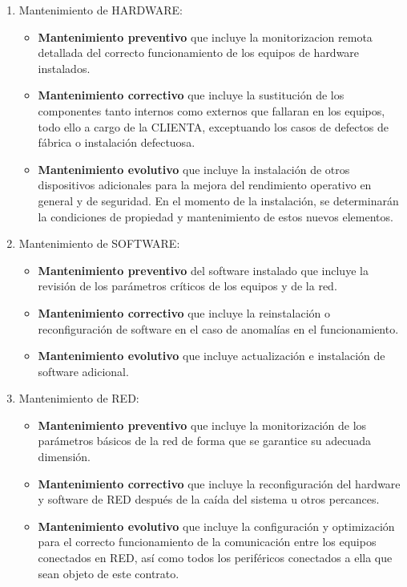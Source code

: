 \documentclass[11pt,spanish,a4paper,]{article}
\begin{document}
\begin{enumerate}
\def\labelenumi{\alph{enumi})}
\itemsep1pt\parskip0pt
\item
  Mantenimiento de HARDWARE:

  \begin{itemize}
  \itemsep1pt\parskip0pt
  \item
    \textbf{Mantenimiento preventivo} que incluye la monitorizacion
    remota detallada del correcto funcionamiento de los equipos de
    hardware instalados.
  \item
    \textbf{Mantenimiento correctivo} que incluye la sustitución de los
    componentes tanto internos como externos que fallaran en los
    equipos, todo ello a cargo de la CLIENTA, exceptuando los casos de
    defectos de fábrica o instalación defectuosa.
  \item
    \textbf{Mantenimiento evolutivo} que incluye la instalación de otros
    dispositivos adicionales para la mejora del rendimiento operativo en
    general y de seguridad. En el momento de la instalación, se
    determinarán la condiciones de propiedad y mantenimiento de estos
    nuevos elementos.
  \end{itemize}
\item
  Mantenimiento de SOFTWARE:

  \begin{itemize}
  \itemsep1pt\parskip0pt
  \item
    \textbf{Mantenimiento preventivo} del software instalado que incluye
    la revisión de los parámetros críticos de los equipos y de la red.
  \item
    \textbf{Mantenimiento correctivo} que incluye la reinstalación o
    reconfiguración de software en el caso de anomalías en el
    funcionamiento.
  \item
    \textbf{Mantenimiento evolutivo} que incluye actualización e
    instalación de software adicional.
  \end{itemize}
\item
  Mantenimiento de RED:

  \begin{itemize}
  \itemsep1pt\parskip0pt
  \item
    \textbf{Mantenimiento preventivo} que incluye la monitorización de
    los parámetros básicos de la red de forma que se garantice su
    adecuada dimensión.
  \item
    \textbf{Mantenimiento correctivo} que incluye la reconfiguración del
    hardware y software de RED después de la caída del sistema u otros
    percances.
  \item
    \textbf{Mantenimiento evolutivo} que incluye la configuración y
    optimización para el correcto funcionamiento de la comunicación
    entre los equipos conectados en RED, así como todos los periféricos
    conectados a ella que sean objeto de este contrato.
  \end{itemize}
\end{enumerate}
\end{document}
